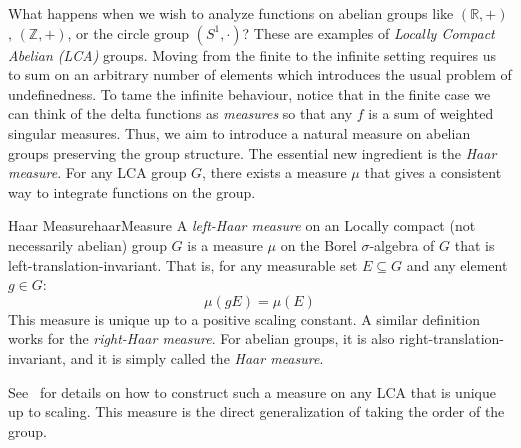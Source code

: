 \documentclass{article}
\newcommand{\R}{{\mathbb{R}}}
\newcommand{\Z}{{\mathbb{Z}}}
\begin{document}
What happens when we wish to analyze functions on abelian groups like $(\R, +)$, $(\Z, +)$, or the circle
group $(S^1, \cdot)$? These are examples of \emph{Locally Compact Abelian (LCA)} groups. Moving from the
finite to the infinite setting requires us to sum on an arbitrary number of elements which introduces the
usual problem of undefinedness. To tame the infinite behaviour, notice that in the finite case we can think of
the delta functions as \emph{measures} so that any $f$ is a sum of weighted singular measures. Thus, we aim to
introduce a natural measure on abelian groups preserving the group structure.
The essential new ingredient is the \emph{Haar measure}. For any LCA group $G$, there exists a measure $\mu$ that gives a consistent way to integrate functions on the group.

\begin{defn}{Haar Measure}{haarMeasure}
	A \emph{left-Haar measure} on an Locally compact (not necessarily abelian) group $G$ is a measure $\mu$ on the Borel $\sigma$-algebra of $G$ that is left-translation-invariant. That is, for any measurable set $E \subseteq G$ and any element $g \in G$:
	\[
		\mu(gE) = \mu(E)
	\]
	This measure is unique up to a positive scaling constant. A similar definition works for the
  \emph{right-Haar measure}. For abelian groups, it is also right-translation-invariant, and it is simply
  called the \emph{Haar measure}.
\end{defn}
See~\cite{NateRealAnalysis} for details on how to construct such a measure on any LCA that is unique up to
scaling. This measure is the direct generalization of taking the order of the group.
\end{document}

